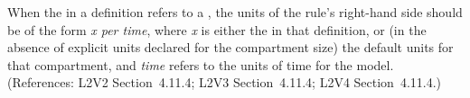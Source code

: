 When the  in a \RateRule definition refers to a
\Compartment, the units of the rule's right-hand side should be of the form
\emph{x per time}, where \emph{x} is either the  in that
\Compartment definition, or (in the absence of explicit units declared for
the compartment size) the default units for that compartment, and
\emph{time} refers to the units of time for the model.  (References: L2V2
Section~4.11.4; L2V3 Section~4.11.4; L2V4 Section~4.11.4.)
